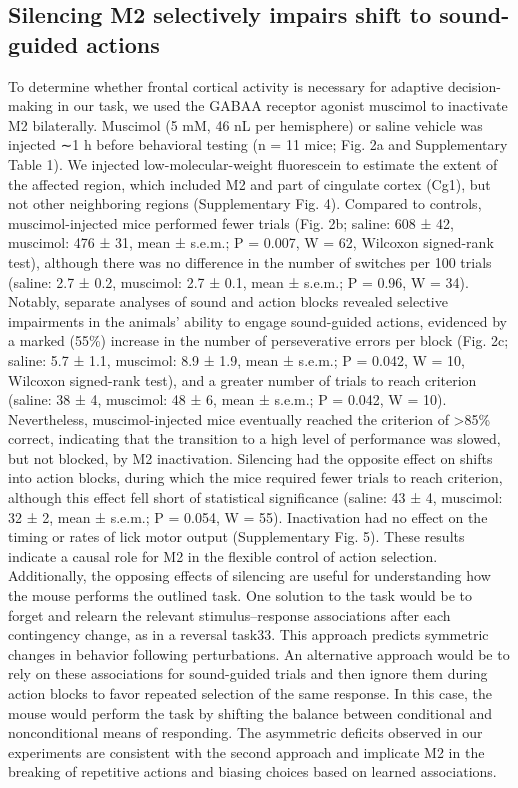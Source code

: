 \subsection{Silencing M2 selectively impairs shift to sound-guided actions}
To determine whether frontal cortical activity is necessary for adaptive decision-making in our task, we used the GABAA receptor agonist muscimol to inactivate M2 bilaterally. Muscimol (5 mM, 46 nL per hemisphere) or saline vehicle was injected ∼1 h before behavioral testing (n = 11 mice; Fig. 2a and Supplementary Table 1). We injected low-molecular-weight fluorescein to estimate the extent of the affected region, which included M2 and part of cingulate cortex (Cg1), but not other neighboring regions (Supplementary Fig. 4). Compared to controls, muscimol-injected mice performed fewer trials (Fig. 2b; saline: 608 ± 42, muscimol: 476 ± 31, mean ± s.e.m.; P = 0.007, W = 62, Wilcoxon signed-rank test), although there was no difference in the number of switches per 100 trials (saline: 2.7 ± 0.2, muscimol: 2.7 ± 0.1, mean ± s.e.m.; P = 0.96, W = 34). Notably, separate analyses of sound and action blocks revealed selective impairments in the animals' ability to engage sound-guided actions, evidenced by a marked (55\%) increase in the number of perseverative errors per block (Fig. 2c; saline: 5.7 ± 1.1, muscimol: 8.9 ± 1.9, mean ± s.e.m.; P = 0.042, W = 10, Wilcoxon signed-rank test), and a greater number of trials to reach criterion (saline: 38 ± 4, muscimol: 48 ± 6, mean ± s.e.m.; P = 0.042, W = 10). Nevertheless, muscimol-injected mice eventually reached the criterion of >85\% correct, indicating that the transition to a high level of performance was slowed, but not blocked, by M2 inactivation. Silencing had the opposite effect on shifts into action blocks, during which the mice required fewer trials to reach criterion, although this effect fell short of statistical significance (saline: 43 ± 4, muscimol: 32 ± 2, mean ± s.e.m.; P = 0.054, W = 55). Inactivation had no effect on the timing or rates of lick motor output (Supplementary Fig. 5). These results indicate a causal role for M2 in the flexible control of action selection. Additionally, the opposing effects of silencing are useful for understanding how the mouse performs the outlined task. One solution to the task would be to forget and relearn the relevant stimulus–response associations after each contingency change, as in a reversal task33. This approach predicts symmetric changes in behavior following perturbations. An alternative approach would be to rely on these associations for sound-guided trials and then ignore them during action blocks to favor repeated selection of the same response. In this case, the mouse would perform the task by shifting the balance between conditional and nonconditional means of responding. The asymmetric deficits observed in our experiments are consistent with the second approach and implicate M2 in the breaking of repetitive actions and biasing choices based on learned associations.

